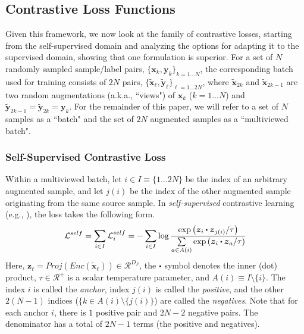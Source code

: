 \subsection{Contrastive Loss Functions}
\label{sec:contrastive_losses}
Given this framework, we now look at the family of contrastive losses, starting from the self-supervised domain and analyzing the options for adapting it to the supervised domain, showing that one formulation is superior. For a set of $N$ randomly sampled sample/label pairs, $\{\boldsymbol{x}_k,\boldsymbol{y}_k\}_{k=1...N}$, the corresponding batch used for training consists of $2N$ pairs, $\{\boldsymbol{\tilde{x}}_\ell,\boldsymbol{\tilde{y}}_\ell\}_{\ell=1...2N}$, where $\boldsymbol{\tilde{x}}_{2k}$ and $\boldsymbol{\tilde{x}}_{2k-1}$ are two random augmentations (a.k.a., ``views") of $\boldsymbol{x}_k$ ($k=1...N$) and $\boldsymbol{\tilde{y}}_{2k-1}=\boldsymbol{\tilde{y}}_{2k}=\boldsymbol{y}_k$. For the remainder of this paper, we will refer to a set of $N$ samples as a ``batch" and the set of $2N$ augmented samples as a ``multiviewed batch".

\subsubsection{Self-Supervised Contrastive Loss}
Within a multiviewed batch, let $i\in I\equiv\{1...2N\}$ be the index of an arbitrary augmented sample, and let $j(i)$ be the index of the other augmented sample originating from the same source sample. In \emph{self-supervised} contrastive learning (e.g., \cite{chen2020simple,tian2019contrastive,henaff2019data,hjelm2018learning}), the loss takes the following form.
\begin{equation}
  \mathcal{L}^{self}
  =\sum_{i\in I}\mathcal{L}_i^{self}
  =-\sum_{i\in I}\log{
  \frac{\text{exp}\left(\boldsymbol{z}_i\bigcdot\boldsymbol{z}_{j(i)}/\tau\right)}{\sum\limits_{a\in A(i)}\text{exp}\left(\boldsymbol{z}_i\bigcdot\boldsymbol{z}_a/\tau\right)}
  }
  \label{eqn:self_loss}
\end{equation}
Here, $\boldsymbol{z}_\ell=Proj(Enc(\boldsymbol{\tilde{x}}_\ell))\in\mathcal{R}^{D_P}$, the $\bigcdot$ symbol denotes the inner (dot) product, $\tau\in\mathcal{R}^+$ is a scalar temperature parameter, and $A(i)\equiv I\setminus\{i\}$. The index $i$ is called the \emph{anchor}, index $j(i)$ is called the \emph{positive}, and the other $2(N-1)$ indices ($\{k\in A(i)\setminus\{j(i)\}$) are called the \emph{negatives}. Note that for each anchor $i$, there is $1$ positive pair and $2N - 2$ negative pairs. The denominator has a total of $2N - 1$ terms (the positive and negatives). 

